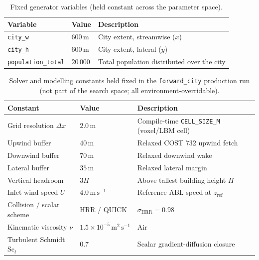 \begin{table}[htbp]
\centering
\caption{Fixed generator variables (held constant across the parameter space).}
\label{tab:fixed}
\begin{tabular}{@{}lll@{}}
\toprule
Variable & Value & Description \\
\midrule
\texttt{city\_w}          & $600\,\mathrm{m}$ & City extent, streamwise ($x$) \\
\texttt{city\_h}          & $600\,\mathrm{m}$ & City extent, lateral ($y$) \\
\texttt{population\_total} & $20\,000$         & Total population distributed over the city \\
\bottomrule
\end{tabular}
\end{table}

\begin{table}[htbp]
\centering
\caption{Solver and modelling constants held fixed in the \texttt{forward\_city}
production run (not part of the search space; all environment-overridable).}
\label{tab:solverconst}
\begin{tabular}{@{}lll@{}}
\toprule
Constant & Value & Description \\
\midrule
Grid resolution $\Delta x$             & $2.0\,\mathrm{m}$                       & Compile-time \texttt{CELL\_SIZE\_M} (voxel/LBM cell) \\
Upwind buffer                          & $40\,\mathrm{m}$                        & Relaxed COST 732 upwind fetch \\
Downwind buffer                        & $70\,\mathrm{m}$                        & Relaxed downwind wake \\
Lateral buffer                         & $35\,\mathrm{m}$                        & Relaxed lateral margin \\
Vertical headroom                      & $3H$                                    & Above tallest building height $H$ \\
Inlet wind speed $U$                   & $4.0\,\mathrm{m\,s^{-1}}$               & Reference ABL speed at $z_\mathrm{ref}$ \\
Collision / scalar scheme              & HRR / QUICK                             & $\sigma_\mathrm{HRR}=0.98$ \\
Kinematic viscosity $\nu$              & $1.5\times10^{-5}\,\mathrm{m^2\,s^{-1}}$ & Air \\
Turbulent Schmidt $\mathrm{Sc}_t$      & $0.7$                                   & Scalar gradient-diffusion closure \\

\end{tabular}
\end{table}
